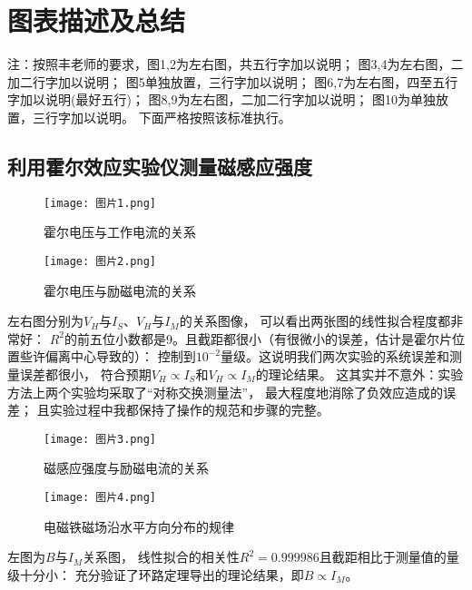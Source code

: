 \documentclass[11pt]{article}
\begin{document}
\section{图表描述及总结}
\begin{kaishu}
	注：按照丰老师的要求，图1,2为左右图，共五行字加以说明；
	图3,4为左右图，二加二行字加以说明；
	图5单独放置，三行字加以说明；
	图6,7为左右图，四至五行字加以说明(最好五行)；
	图8,9为左右图，二加二行字加以说明；
    图10为单独放置，三行字加以说明。
    下面严格按照该标准执行。

\end{kaishu}

\subsection{利用霍尔效应实验仪测量磁感应强度}

\begin{figure}[H]
	\centering
	\begin{minipage}{0.49\linewidth}
		\centering
		\texttt{[image: 图片1.png]}
		\caption{霍尔电压与工作电流的关系}
	\end{minipage}
	\begin{minipage}{0.49\linewidth}
		\centering
		\texttt{[image: 图片2.png]}
		\caption{霍尔电压与励磁电流的关系}
	\end{minipage}
\end{figure}

左右图分别为$V_H$与$I_S$、$V_H$与$I_M$的关系图像，
可以看出两张图的线性拟合程度都非常好：
$R^2$的前五位小数都是9。且截距都很小（有很微小的误差，估计是霍尔片位置些许偏离中心导致的）：
控制到$10^{-2}$量级。这说明我们两次实验的系统误差和测量误差都很小，
符合预期$V_H\varpropto I_S$和$V_H\varpropto I_M$的理论结果。
这其实并不意外：实验方法上两个实验均采取了“对称交换测量法”，
最大程度地消除了负效应造成的误差；
且实验过程中我都保持了操作的规范和步骤的完整。


\begin{figure}[H]
	\centering
	\begin{minipage}{0.49\linewidth}
		\centering
		\texttt{[image: 图片3.png]}
		\caption{磁感应强度与励磁电流的关系}
	\end{minipage}
	\begin{minipage}{0.49\linewidth}
		\centering
		\texttt{[image: 图片4.png]}
		\caption{电磁铁磁场沿水平方向分布的规律}
	\end{minipage}
\end{figure}
左图为$B$与$I_M$关系图，
线性拟合的相关性$R^2=0.999986$且截距相比于测量值的量级十分小：
充分验证了环路定理导出的理论结果，即$B\varpropto I_M$。
\end{document}
